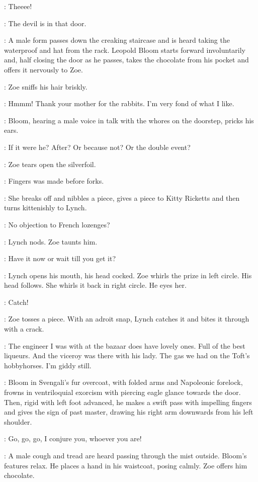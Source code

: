 \Doorhandle:
Theeee!

\Zoe:
The devil is in that door.

:
A male form passes down the creaking staircase
and is heard taking the waterproof and hat from the rack.
Leopold Bloom starts forward involuntarily and,
half closing the door as he passes,
takes the chocolate from his pocket
%
and offers it nervously to Zoe.

:
Zoe sniffs his hair briskly.

\Zoe:
Hmmm!
Thank your mother for the rabbits.
I'm very fond of what I like.

:
Bloom, hearing a male voice in talk with the whores on the doorstep, pricks his ears.

\Bloom:
If it were he?
After?
Or because not?
Or the double event?

:
Zoe tears open the silverfoil.

\Zoe:
Fingers was made before forks.

:
She breaks off and nibbles a piece, gives a piece to Kitty Ricketts
and then turns kittenishly to Lynch.

\Zoe:
No objection to French lozenges?

:
Lynch nods.
Zoe taunts him.

\Zoe:
Have it now or wait till you get it?

:
Lynch opens his mouth, his head cocked.
Zoe whirls the prize in left circle.
His head follows.
She whirls it back in right circle.
He eyes her.

\Zoe:
Catch!

:
Zoe tosses a piece.
With an adroit snap, Lynch catches it and bites it through with a crack.

\Kitty:
The engineer I was with at the bazaar does have lovely ones.
Full of the best liqueurs.
And the viceroy was there with his lady.
The gas we had on the Toft's hobbyhorses.
I'm giddy still.

:
Bloom in Svengali's fur overcoat, with folded arms and Napoleonic forelock,
frowns in ventriloquial exorcism with piercing eagle glance towards the door.
Then, rigid with left foot advanced, he makes a swift pass
with impelling fingers and gives the sign of past master,
drawing his right arm downwards from his left shoulder.

\Bloom:
Go, go, go, I conjure you, whoever you are!

:
A male cough and tread are heard passing through the mist outside.
Bloom's features relax.
He places a hand in his waistcoat, posing calmly.
Zoe offers him chocolate.

